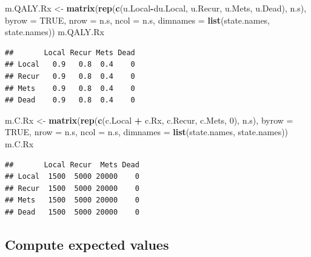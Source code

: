 \documentclass[]{article}
\newenvironment{Shaded}{\begin{snugshade}}{\end{snugshade}}
\newcommand{\KeywordTok}[1]{\textcolor[rgb]{0.13,0.29,0.53}{\textbf{#1}}}
\newcommand{\DataTypeTok}[1]{\textcolor[rgb]{0.13,0.29,0.53}{#1}}
\newcommand{\DecValTok}[1]{\textcolor[rgb]{0.00,0.00,0.81}{#1}}
\newcommand{\StringTok}[1]{\textcolor[rgb]{0.31,0.60,0.02}{#1}}
\newcommand{\OtherTok}[1]{\textcolor[rgb]{0.56,0.35,0.01}{#1}}
\newcommand{\OperatorTok}[1]{\textcolor[rgb]{0.81,0.36,0.00}{\textbf{#1}}}
\newcommand{\NormalTok}[1]{#1}
\theoremstyle{definition}
\theoremstyle{definition}
\theoremstyle{definition}
\theoremstyle{remark}
\begin{document}
\begin{Shaded}
\begin{Highlighting}[]
\NormalTok{m.QALY.Rx <-}\StringTok{ }\KeywordTok{matrix}\NormalTok{(}\KeywordTok{rep}\NormalTok{(}\KeywordTok{c}\NormalTok{(u.Local}\OperatorTok{-}\NormalTok{du.Local, u.Recur, u.Mets, u.Dead), n.s),}
                    \DataTypeTok{byrow =} \OtherTok{TRUE}\NormalTok{,}
                 \DataTypeTok{nrow =}\NormalTok{ n.s, }\DataTypeTok{ncol =}\NormalTok{ n.s, }
                 \DataTypeTok{dimnames =} \KeywordTok{list}\NormalTok{(state.names, state.names))}
\NormalTok{m.QALY.Rx}
\end{Highlighting}
\end{Shaded}

\begin{verbatim}
##       Local Recur Mets Dead
## Local   0.9   0.8  0.4    0
## Recur   0.9   0.8  0.4    0
## Mets    0.9   0.8  0.4    0
## Dead    0.9   0.8  0.4    0
\end{verbatim}

\begin{Shaded}
\begin{Highlighting}[]
\NormalTok{m.C.Rx <-}\StringTok{ }\KeywordTok{matrix}\NormalTok{(}\KeywordTok{rep}\NormalTok{(}\KeywordTok{c}\NormalTok{(c.Local }\OperatorTok{+}\StringTok{ }\NormalTok{c.Rx, c.Recur, c.Mets, }\DecValTok{0}\NormalTok{), n.s),}
                 \DataTypeTok{byrow =} \OtherTok{TRUE}\NormalTok{,}
                 \DataTypeTok{nrow =}\NormalTok{ n.s, }\DataTypeTok{ncol =}\NormalTok{ n.s, }
                 \DataTypeTok{dimnames =} \KeywordTok{list}\NormalTok{(state.names, state.names))}
\NormalTok{m.C.Rx}
\end{Highlighting}
\end{Shaded}

\begin{verbatim}
##       Local Recur  Mets Dead
## Local  1500  5000 20000    0
## Recur  1500  5000 20000    0
## Mets   1500  5000 20000    0
## Dead   1500  5000 20000    0
\end{verbatim}

\subsection{Compute expected values}\label{compute-expected-values-1}

\begin{Shaded}
\end{Shaded}
\end{document}
